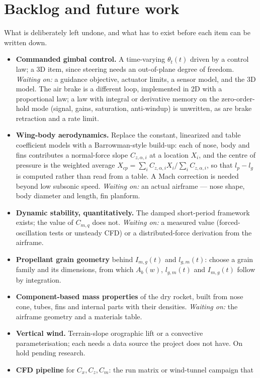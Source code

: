 \section{Backlog and future work}\label{sec:backlog}
What is deliberately left undone, and what has to exist before each item can be written down.
\begin{itemize}
    \item \textbf{Commanded gimbal control.} A time-varying $\theta_t(t)$ driven by a control law;
    a 3D item, since steering needs an out-of-plane degree of freedom. \emph{Waiting on:} a
    guidance objective, actuator limits, a sensor model, and the 3D model. The air brake is a
    different loop, implemented in 2D with a proportional law; a law with integral or derivative
    memory on the zero-order-hold mode (signal, gains, saturation, anti-windup) is unwritten, as
    are brake retraction and a rate limit.
    \item \textbf{Wing-body aerodynamics.} Replace the constant, linearized and table
    coefficient models with a Barrowman-style build-up: each of nose, body and fins contributes a
    normal-force slope $C_{z,\alpha,i}$ at a location $X_i$, and the centre of pressure is the
    weighted average $X_{cp}=\sum_iC_{z,\alpha,i}X_i/\sum_iC_{z,\alpha,i}$, so that $l_p-l_g$ is
    computed rather than read from a table. A Mach correction is needed beyond low subsonic speed.
    \emph{Waiting on:} an actual airframe --- nose shape, body diameter and length, fin planform.
    \item \textbf{Dynamic stability, quantitatively.} The damped short-period framework exists;
    the value of $C_{m,q}$ does not. \emph{Waiting on:} a measured value (forced-oscillation
    tests or unsteady CFD) or a distributed-force derivation from the airframe.
    \item \textbf{Propellant grain geometry} behind $I_{m,g}(t)$ and $l_{g,m}(t)$: choose a grain
    family and its dimensions, from which $A_b(w)$, $l_{g,m}(t)$ and $I_{m,g}(t)$ follow by
    integration.
    \item \textbf{Component-based mass properties} of the dry rocket, built from nose cone, tubes,
    fins and internal parts with their densities. \emph{Waiting on:} the airframe geometry and a
    materials table.
    \item \textbf{Vertical wind.} Terrain-slope orographic lift or a convective parameterisation;
    each needs a data source the project does not have. On hold pending research.
    \item \textbf{CFD pipeline} for $C_x,C_z,C_m$: the run matrix or wind-tunnel campaign that

\end{itemize}
